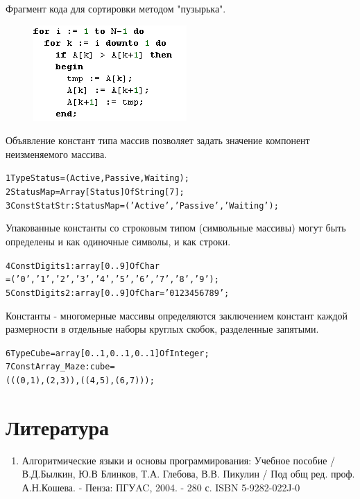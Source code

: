 \documentclass{beamer}
\begin{document}
\begin{frame}
Фрагмент кода для сортировки методом "пузырька".
\begin{figure}[h]
\centering
\includegraphics[scale=1.0]{images/array_sort_code.png}
\label{pic-sort}
\end{figure}
\end{frame}

\begin{frame}[fragile]
Объявление констант типа массив позволяет задать значение компонент неизменяемого массива.
\begin{alltt}
1  Type Status = (Active, Passive, Waiting); 
2    StatusMap = Array [Status] Of String[7];
3  Const StatStr : StatusMap = ('Active', 'Passive', 'Waiting');
\end{alltt}
Упакованные константы со строковым типом (символьные массивы) могут быть определены и как одиночные символы, и как строки.
\begin{alltt}
4  Const Digits1 : array [0..9] Of Char 
         = ('0', '1', '2', '3', '4', '5','6', '7', '8', '9'); 
5  Const Digits2 : array [0..9] Of Char = '0123456789';
\end{alltt}
Константы - многомерные массивы определяются заключением констант каждой размерности в отдельные наборы круглых скобок, разделенные запятыми.
\begin{alltt}
6  Type Cube = array[0..1, 0..1, 0..1] Of Integer;
7  Const Array_Maze : cube = 
     (((0, 1), (2, 3)), ((4, 5), (6, 7)));
\end{alltt}
\end{frame}
   
\section*{Литература}
\begin{frame}   
\begin{enumerate}
\item Алгоритмические языки и основы программирования: Учебное пособие / В.Д.Былкин, Ю.В Блинков, Т.А. Глебова, В.В. Пикулин / Под общ ред. проф. А.Н.Кошева. - Пенза: ПГУAC, 2004. - 280 с. ISBN 5-9282-022J-0
\end{enumerate}
\end{frame}   
\end{document}
